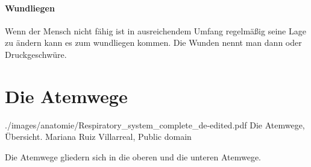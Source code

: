 \paragraph{Wundliegen}
\label{topic:dekubitus}Wenn der Mensch nicht
fähig ist in ausreichendem Umfang regelmäßig seine Lage zu ändern kann es zum
wundliegen kommen. Die Wunden nennt man dann  oder Druckgeschwüre.


\clearpage
\section{Die Atemwege}



{}
{}
{./images/anatomie/Respiratory_system_complete_de-edited.pdf}
{Die Atemwege, Übersicht.\label{fig:respiraktionstrakt-uebersicht}}
{Mariana Ruiz Villarreal, Public domain}




Die Atemwege gliedern sich in die oberen und die unteren Atemwege.


